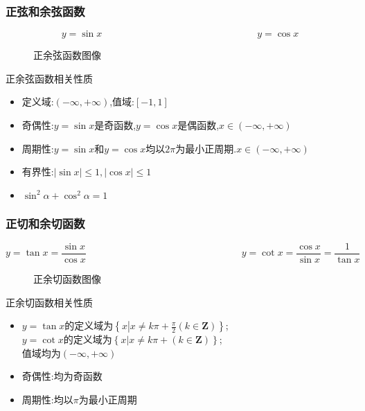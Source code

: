 \documentclass[8pt a4paper, oneside, UTF8]{ctexbook}  %
\begin{document}
\begin{sloppypar}
    \subsubsection{正弦和余弦函数}
    $$
        \boxed{y=\sin x}
        \qquad \qquad \qquad \qquad \qquad \qquad \qquad \qquad
        \boxed{y=\cos x}
    $$
    \begin{figure}[H] \centering
        \caption{正余弦函数图像}
    \end{figure}
    \begin{criterion}{正余弦函数相关性质}{}
        \begin{itemize}
            \item 定义域:$(-\infty,+\infty)$,值域:$[-1,1]$
            \item 奇偶性:$y=\sin x$是奇函数,$y=\cos x$是偶函数,$x\in (-\infty,+\infty)$
            \item 周期性:$y=\sin x$和$y=\cos x$均以$2\pi$为最小正周期.$x\in (-\infty,+\infty)$
            \item 有界性:$\left|\sin x\right|\leqslant1,\left|\cos x\right|\leqslant1$
            \item $\sin^{2}\alpha+\cos^{2}\alpha=1$
        \end{itemize}
    \end{criterion}
    \subsubsection{正切和余切函数}
    $$
        \boxed{y=\tan x=\frac{\sin x}{\cos x}}
        \qquad \qquad \qquad \qquad \qquad \qquad \qquad \qquad
        \boxed{y=\cot x=\frac{\cos x}{\sin x}=\frac{1}{\tan x}}
    $$
    \begin{figure}[H] \centering
        \caption{正余切函数图像}
    \end{figure}
    \begin{criterion}{正余切函数相关性质}{}
        \begin{itemize}
            \item $y=\tan x$的定义域为$\left\{x\left|x\neq k\pi+\frac{\pi}{2}\left(k\in\mathbf{Z}\right)\right\}\right.$;\\$y=\cot x$的定义域为$\left\{x\left|x\neq k\pi+\left(k\in\mathbf{Z}\right)\right\}\right.$;\\
                      值域均为$(-\infty,+\infty)$
            \item 奇偶性:均为奇函数
            \item 周期性:均以$\pi$为最小正周期
        \end{itemize}
    \end{criterion}


\end{sloppypar}
\end{document}
